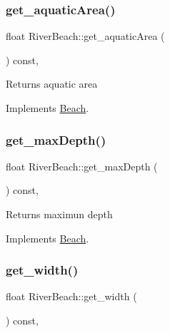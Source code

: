 \subsubsection{\texorpdfstring{get\+\_\+aquatic\+Area()}{get\_aquaticArea()}}
{\footnotesize\ttfamily float River\+Beach\+::get\+\_\+aquatic\+Area (\begin{DoxyParamCaption}{ }\end{DoxyParamCaption}) const\hspace{0.3cm}{\ttfamily [inline]}, {\ttfamily [virtual]}}

\begin{DoxyReturn}{Returns}
aquatic area 
\end{DoxyReturn}


Implements \hyperlink{class_beach_afc6a57f98777ec5de1882acaf2703e6d}{Beach}.

\mbox{\label{class_river_beach_a0bb0a4f13ad1e2d7576d5ef641057e11}} 
\subsubsection{\texorpdfstring{get\+\_\+max\+Depth()}{get\_maxDepth()}}
{\footnotesize\ttfamily float River\+Beach\+::get\+\_\+max\+Depth (\begin{DoxyParamCaption}{ }\end{DoxyParamCaption}) const\hspace{0.3cm}{\ttfamily [inline]}, {\ttfamily [virtual]}}

\begin{DoxyReturn}{Returns}
maximun depth 
\end{DoxyReturn}


Implements \hyperlink{class_beach_a5942f7aa56af3b61d2974a754913ab7e}{Beach}.

\mbox{\label{class_river_beach_a4fc528a34d80e3e2a6a48e53ab3e3f49}} 
\subsubsection{\texorpdfstring{get\+\_\+width()}{get\_width()}}
{\footnotesize\ttfamily float River\+Beach\+::get\+\_\+width (\begin{DoxyParamCaption}{ }\end{DoxyParamCaption}) const\hspace{0.3cm}{\ttfamily [inline]}, {\ttfamily [virtual]}}

